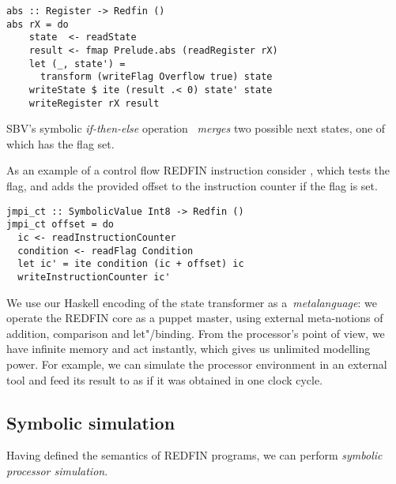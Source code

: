 \begin{verbatim}
abs :: Register -> Redfin ()
abs rX = do
    state  <- readState
    result <- fmap Prelude.abs (readRegister rX)
    let (_, state') =
      transform (writeFlag Overflow true) state
    writeState $ ite (result .< 0) state' state
    writeRegister rX result
\end{verbatim}

\noindent
SBV's symbolic \emph{if-then-else} operation~ \emph{merges} two possible
next states, one of which has the  flag set.


As an example of a control flow REDFIN instruction consider , which
tests the~ flag, and adds the provided offset to the instruction
counter if the flag is set.

\begin{verbatim}
jmpi_ct :: SymbolicValue Int8 -> Redfin ()
jmpi_ct offset = do
  ic <- readInstructionCounter
  condition <- readFlag Condition
  let ic' = ite condition (ic + offset) ic
  writeInstructionCounter ic'
\end{verbatim}

\noindent
We use our Haskell encoding of the state transformer as a~\emph{metalanguage}:
we operate the REDFIN core as a puppet master, using external meta-notions of
addition, comparison and let"/binding. From the processor's
point of view, we have infinite memory and act instantly, which gives us unlimited
modelling power. For example, we can simulate the processor environment
in an external tool and feed its result to  as if it was
obtained in one clock cycle.

\subsection{Symbolic simulation}

Having defined the semantics of REDFIN programs, we can perform
\emph{symbolic processor simulation}.

